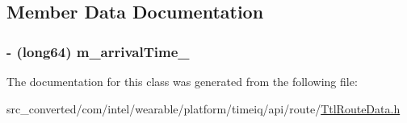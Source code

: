 \subsection{Member Data Documentation}
\hypertarget{interface_ttl_route_data_a2d67f06048298a0dc31cec8ee973b59f}{}
\subsubsection[{m\+\_\+arrival\+Time\+\_\+}]{\setlength{\rightskip}{0pt plus 5cm}-\/ (long64) m\+\_\+arrival\+Time\+\_\+}\label{interface_ttl_route_data_a2d67f06048298a0dc31cec8ee973b59f}


The documentation for this class was generated from the following file\+:\begin{DoxyCompactItemize}
\item 
src\+\_\+converted/com/intel/wearable/platform/timeiq/api/route/\hyperlink{_ttl_route_data_8h}{Ttl\+Route\+Data.\+h}\end{DoxyCompactItemize}
